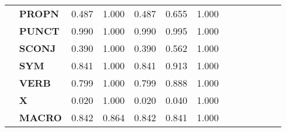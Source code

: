 \begin{longtable}{|l||l||l||l||l||l||l||l||l||l||l||l||l|}
\textbf{} & \textbf{PROPN} & 0.487 & 1.000 & 0.487 & 0.655 & 1.000 \\
\textbf{} & \textbf{PUNCT} & 0.990 & 1.000 & 0.990 & 0.995 & 1.000 \\
\textbf{} & \textbf{SCONJ} & 0.390 & 1.000 & 0.390 & 0.562 & 1.000 \\
\textbf{} & \textbf{SYM} & 0.841 & 1.000 & 0.841 & 0.913 & 1.000 \\
\textbf{} & \textbf{VERB} & 0.799 & 1.000 & 0.799 & 0.888 & 1.000 \\
\textbf{} & \textbf{X} & 0.020 & 1.000 & 0.020 & 0.040 & 1.000 \\
\textbf{} & \textbf{MACRO} & 0.842 & 0.864 & 0.842 & 0.841 & 1.000 \\
\cline{1-7}
\end{longtable}
